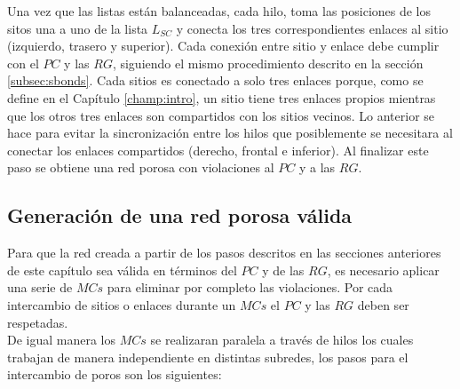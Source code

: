 Una vez que las listas están balanceadas, cada hilo, toma las posiciones de los sitos una a uno de la lista $L_{SC}$ y conecta los tres correspondientes enlaces al sitio (izquierdo, trasero y superior). Cada conexión entre sitio y enlace debe cumplir con el $PC$ y las $RG$, siguiendo el mismo procedimiento descrito en la sección \ref{subsec:sbonds}. Cada sitios es conectado a solo tres enlaces porque, como se define en el Capítulo \ref{champ:intro}, un sitio tiene tres enlaces propios mientras que los otros tres enlaces son compartidos con los sitios vecinos. Lo anterior se hace para evitar la sincronización entre los hilos que posiblemente se necesitara al conectar los enlaces compartidos (derecho, frontal e inferior). Al finalizar este paso se obtiene una red porosa con violaciones al $PC$ y a las $RG$.

\subsection{Generación de una red porosa válida}
\label{subsec:pvalid}
Para que la red creada a partir de los pasos descritos en las secciones anteriores de este capítulo sea válida en términos del $PC$ y de las $RG$, es necesario aplicar una serie de $MCs$ para eliminar por completo las violaciones. Por cada intercambio de sitios o enlaces durante un $MCs$ el $PC$ y las $RG$ deben ser respetadas.\\

De igual manera los $MCs$ se realizaran paralela a través de hilos los cuales trabajan de manera independiente en distintas subredes, los pasos para el intercambio de poros son los siguientes:

